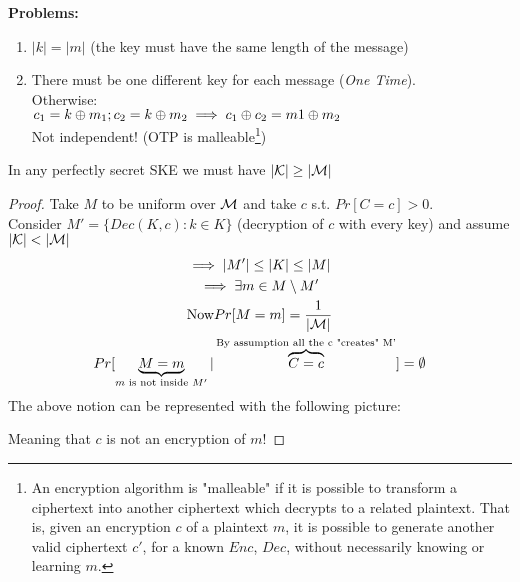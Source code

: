 \textbf{Problems:}
\begin{enumerate}
    \item $|k|=|m|$ (the key must have the same length of the message)
    \item There must be one different key for each message (\textit{One Time}).\\Otherwise:\\
    $c_1=k\oplus m_1; c_2=k \oplus m_2 \implies c_1\oplus c_2=m1\oplus m_2$\\
    Not independent! (OTP is malleable\footnote{An encryption algorithm is "malleable" if it is possible to transform a ciphertext into another ciphertext which decrypts to a related plaintext. That is, given an encryption $c$ of a plaintext $m$, it is possible to generate another valid ciphertext $c'$, for a known $Enc$, $Dec$, without necessarily knowing or learning $m$. })
\end{enumerate}

\begin{theorem}
    In any perfectly secret SKE we must have $|\mathcal{K}|\geq |\mathcal{M}|$
\end{theorem}
\begin{proof}
    Take $M$ to be uniform over $\mathcal{M}$ and take $c$ s.t. $Pr[C=c]>0$.\\
    Consider $M'=\{Dec(K,c):k\in K\}$ (decryption of $c$ with every key) and assume $|\K|<|\M|$
    \begin{gather*}
        \implies |M'|\leq |K|\leq |M|\\
        \implies \exists m \in M \setminus M'\\
        \text{Now} Pr[M=m]=\frac{1}{|\mathcal{M}|}\\
        Pr[\underbrace{M=m}_{m\text{ is not inside }M'}|\overbrace{C=c}^{\text{By assumption all the c "creates" M'}}]=\emptyset
    \end{gather*}
    The above notion can be represented with the following picture:\\
    \def\firstcircle{(0,0) circle (1.5cm)}
    \def\secondcircle{(60:0) circle (0.9cm)}
    Meaning that $c$ is not an encryption of $m$!
\end{proof}